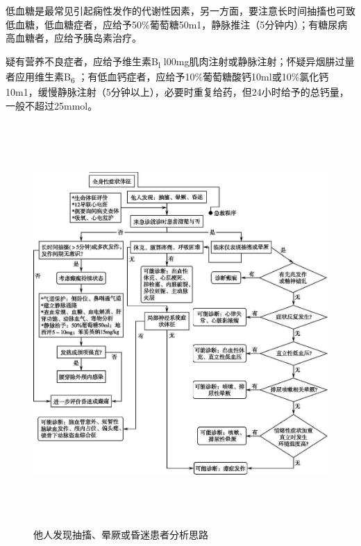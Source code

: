 低血糖是最常见引起痫性发作的代谢性因素，另一方面，要注意长时间抽搐也可致低血糖，低血糖症者，应给予50\%葡萄糖50m1，静脉推注（5分钟内）；有糖尿病高血糖者，应给予胰岛素治疗。

疑有营养不良症者，应给予维生素B\textsubscript{l}
l00mg肌肉注射或静脉注射；怀疑异烟肼过量者应用维生素B\textsubscript{6}
；有低血钙症者，应给予10\%葡萄糖酸钙10ml或10\%氯化钙10m1，缓慢静脉注射（5分钟以上），必要时重复给药，但24小时给予的总钙量，一般不超过25mmol。

\begin{figure}[!htbp]
 \centering
 \includegraphics[width=5.88542in,height=6.04167in]{./images/Image00034.jpg}
 \captionsetup{justification=centering}
 \caption{他人发现抽搐、晕厥或昏迷患者分析思路}
 \label{fig5-1}
  \end{figure} 

